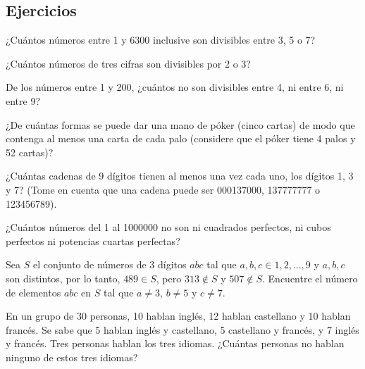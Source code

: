 \documentclass[12pt]{article}
\begin{document}
\newpage

\subsection{Ejercicios}

\begin{ejercicio}
    ¿Cuántos números entre 1 y 6300 inclusive son divisibles entre 3, 5 o 7?
\end{ejercicio}

\begin{ejercicio}
    ¿Cuántos números de tres cifras son divisibles por 2 o 3?
\end{ejercicio}

\begin{ejercicio}
    De los números entre 1 y 200, ¿cuántos no son divisibles entre 4, ni entre 6, ni entre 9?
\end{ejercicio}

\begin{ejercicio}
    ¿De cuántas formas se puede dar una mano de póker (cinco cartas) de modo que contenga al menos una carta de cada palo (considere que el póker tiene 4 palos y 52 cartas)?
\end{ejercicio}

\begin{ejercicio}
    ¿Cuántas cadenas de 9 dígitos tienen al menos una vez cada uno, los dígitos 1, 3 y 7? (Tome en cuenta que una cadena puede ser 000137000, 137777777 o 123456789).
\end{ejercicio}

\begin{ejercicio}
    ¿Cuántos números del 1 al 1000000 no son ni cuadrados perfectos, ni cubos perfectos ni potencias cuartas perfectas?
\end{ejercicio}

\begin{ejercicio}
    Sea $S$ el conjunto de números de 3 dígitos $abc$ tal que $a, b, c \in 1,2, . . . ,9$ y $a,b,c$ son distintos, por lo tanto, $489 \in S$, pero $313 \notin S$ y $507 \notin S$. Encuentre el número de elementos $abc$ en $S$ tal que $a \neq 3$, $b \neq 5$ y $c \neq 7$.
\end{ejercicio}

\begin{ejercicio}
    En un grupo de 30 personas, 10 hablan inglés, 12 hablan castellano y 10 hablan francés. Se sabe que 5 hablan inglés y castellano, 5 castellano y francés, y 7 inglés y francés. Tres personas hablan los tres idiomas. ¿Cuántas personas no hablan ninguno de estos tres idiomas?
\end{ejercicio}
\end{document}
